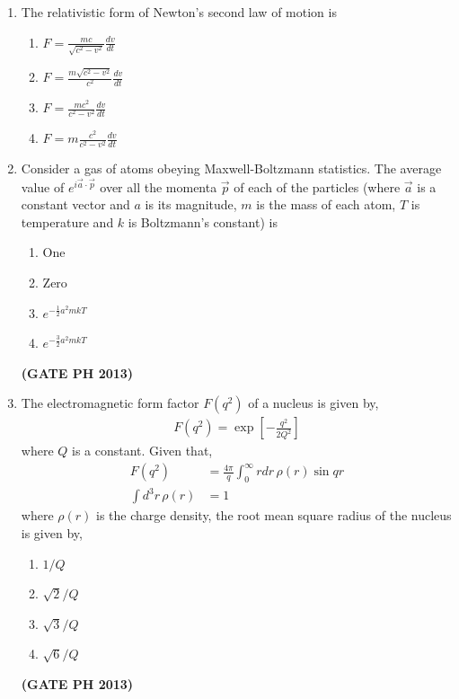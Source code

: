 \documentclass[14pt, a4paper]{extarticle}
\renewcommand{\vec}[1]{\overrightarrow{#1}}
\begin{document}
\begin{enumerate}[label=\textbf{Q. \arabic*}]
\item The relativistic form of Newton's second law of motion is
\begin{enumerate}
    \item $F = \frac{mc}{\sqrt{c^2-v^2}}\frac{dv}{dt}$
    \item $F = \frac{m\sqrt{c^2-v^2}}{c^2}\frac{dv}{dt}$
    \item $F = \frac{mc^2}{c^2-v^2}\frac{dv}{dt}$
    \item $F = m\frac{c^2}{c^2-v^2}\frac{dv}{dt}$
\end{enumerate}

\item Consider a gas of atoms obeying Maxwell-Boltzmann statistics. The average value of $e^{i\vec{a} \cdot \vec{p}}$ over all the momenta $\vec{p}$ of each of the particles (where $\vec{a}$ is a constant vector and $a$ is its magnitude, $m$ is the mass of each atom, $T$ is temperature and $k$ is Boltzmann's constant) is
\begin{multicols}{4}
    \begin{enumerate}
        \item One
        \item Zero
        \item $e^{-\frac{1}{2}a^2mkT}$
        \item $e^{-\frac{3}{2}a^2mkT}$
    \end{enumerate}
\end{multicols}
\hfill \textbf{(GATE PH 2013)}

\item The electromagnetic form factor $F(q^2)$ of a nucleus is given by,
\begin{align*}
 F(q^2) = \exp\left[-\frac{q^2}{2Q^2}\right]
\end{align*}
where $Q$ is a constant. Given that,
\begin{align*}
    F(q^2) &= \frac{4\pi}{q}\int_0^\infty rdr\,\rho(r)\sin qr \\
    \int d^3r\,\rho(r) &= 1
\end{align*}
where $\rho(r)$ is the charge density, the root mean square radius of the nucleus is given by,
\begin{multicols}{4}
    \begin{enumerate}
        \item $1/Q$
        \item $\sqrt{2}/Q$
        \item $\sqrt{3}/Q$
        \item $\sqrt{6}/Q$
    \end{enumerate}
\end{multicols}
\hfill \textbf{(GATE PH 2013)}


\end{enumerate}
\end{document}
